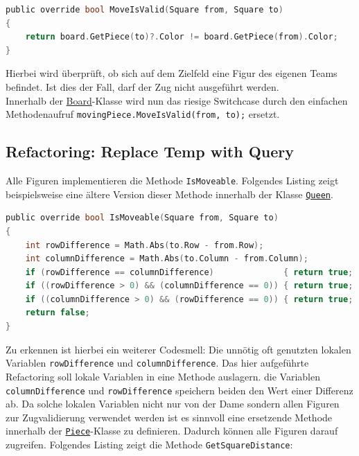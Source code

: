 \documentclass[
10pt, %
a4paper, %
oneside, %
headinclude,footinclude, %
BCOR5mm, %
]{scrartcl}
\begin{document}
\begin{onehalfspace}
\begin{lstlisting}[language=c, style=mStyle]
public override bool MoveIsValid(Square from, Square to)
{
	return board.GetPiece(to)?.Color != board.GetPiece(from).Color;
}
\end{lstlisting}

Hierbei wird überprüft, ob sich auf dem Zielfeld eine Figur des eigenen Teams befindet. Ist dies der Fall, darf der Zug nicht ausgeführt werden.\\
Innerhalb der \href{https://github.com/schmida736/Chess-AdvancedSE/blob/main/Chess-AdvancedSE/Game\%20Elements/Board.cs}{Board}-Klasse wird nun das riesige Switchcase durch den einfachen Methodenaufruf \texttt{movingPiece.MoveIsValid(from, to);} ersetzt.

\subsection{Refactoring: Replace Temp with Query}
\label{sec:replTemp}
Alle Figuren implementieren die Methode \texttt{IsMoveable}. Folgendes Listing zeigt beispielsweise eine ältere Version dieser Methode innerhalb der Klasse \texttt{\href{https://github.com/schmida736/Chess-AdvancedSE/blob/main/Chess-AdvancedSE/Game\%20Elements/Pieces/Queen.cs}{Queen}}.


\begin{lstlisting}[language=c, style=mStyle]
public override bool IsMoveable(Square from, Square to)
{
	int rowDifference = Math.Abs(to.Row - from.Row);
	int columnDifference = Math.Abs(to.Column - from.Column);
	if (rowDifference == columnDifference)              { return true; }
	if ((rowDifference > 0) && (columnDifference == 0)) { return true; }
	if ((columnDifference > 0) && (rowDifference == 0)) { return true; }
	return false;
}
\end{lstlisting}
Zu erkennen ist hierbei ein weiterer Codesmell: Die unnötig oft genutzten lokalen Variablen \texttt{rowDifference} und \texttt{columnDifference}. Das hier aufgeführte Refactoring soll lokale Variablen in eine Methode auslagern. die Variablen \texttt{columnDifference} und \texttt{rowDifference} speichern beiden den Wert einer Differenz ab. Da solche lokalen Variablen nicht nur von der Dame sondern allen Figuren zur Zugvalidierung verwendet werden ist es sinnvoll eine ersetzende Methode innerhalb der \texttt{\href{https://github.com/schmida736/Chess-AdvancedSE/blob/main/Chess-AdvancedSE/Game\%20Elements/Pieces/Piece.cs}{Piece}}-Klasse zu definieren. Dadurch können alle Figuren darauf zugreifen. Folgendes Listing zeigt die Methode \texttt{GetSquareDistance}:


\end{onehalfspace}
\end{document}
